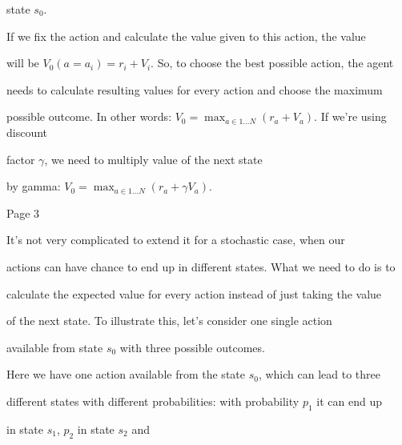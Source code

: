 state \begin{math}s_0\end{math}.


If we fix the action and calculate the value given to this action, the value

will be \begin{math}V_0(a=a_i) = r_i + V_i\end{math}. So, to choose the best possible action, the agent

needs to calculate resulting values for every action and choose the maximum

possible outcome. In other words: \begin{math}V_0 = \max_{a \in 1 \ldots N}(r_a + V_a)\end{math}. If we’re using discount

factor \begin{math}\gamma\end{math}, we need to multiply value of the next state

by gamma: \begin{math}V_0 = \max_{a \in 1 \ldots N}(r_a + \gamma V_a)\end{math}.




Page 3


It’s not very complicated to extend it for a stochastic case, when our

actions can have chance to end up in different states. What we need to do is to

calculate the expected value for every action instead of just taking the value

of the next state. To illustrate this, let’s consider one single action

available from state \begin{math}s_0\end{math} with three possible outcomes.


Here we have one action available from the state \begin{math}s_0\end{math}, which can lead to three

different states with different probabilities: with probability \begin{math}p_1\end{math} it can end up

in state \begin{math}s_1\end{math}, \begin{math}p_2\end{math} in state \begin{math}s_2\end{math} and

